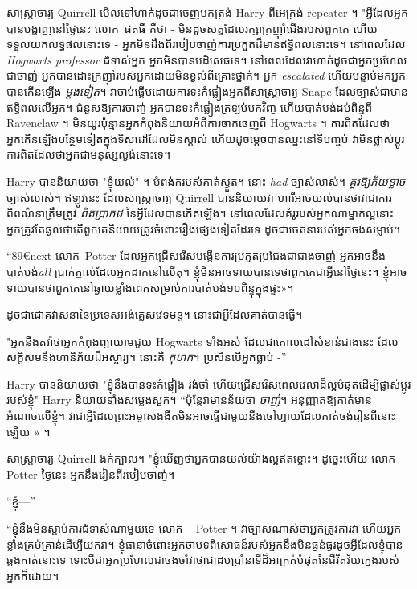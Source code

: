 {{{{សាស្រ្តាចារ្យ Quirrell មើលទៅហាក់ដូចជាចេញមកត្រង់ Harry ពីអេក្រង់ repeater ។ "អ្វីដែលអ្នកបានបង្ហាញនៅថ្ងៃនេះ លោក~ផតធឺ គឺថា - មិនដូចសត្វដែលរក្សាក្រញ៉ាំជើងរបស់ពួកគេ ហើយទទួលយកលទ្ធផលនោះទេ - អ្នកមិនដឹងពីរបៀបចាញ់ការប្រកួតដ៏មានឥទ្ធិពលនោះទេ។ នៅពេលដែល \emph{Hogwarts professor} ជំទាស់អ្នក អ្នកមិនបានបដិសេធទេ។ នៅពេលដែលវាហាក់ដូចជាអ្នកប្រហែលជាចាញ់ អ្នកបានដោះក្រញ៉ាំរបស់អ្នកដោយមិនខ្វល់ពីគ្រោះថ្នាក់។ អ្នក \emph{escalated} ហើយបន្ទាប់មកអ្នកបានកើនឡើង \emph{ម្តងទៀត}។ វាចាប់ផ្តើមដោយការទះកំផ្លៀងអ្នកពីសាស្រ្តាចារ្យ Snape ដែលច្បាស់ជាមានឥទ្ធិពលលើអ្នក។ ជំនួសឱ្យការចាញ់ អ្នកបានទះកំផ្លៀងត្រឡប់មកវិញ ហើយបាត់បង់ដប់ពិន្ទុពី Ravenclaw ។ មិនយូរប៉ុន្មានអ្នកកំពុងនិយាយអំពីការចាកចេញពី Hogwarts ។ ការពិតដែលថាអ្នកកើនឡើងបន្ថែមទៀតក្នុងទិសដៅដែលមិនស្គាល់ ហើយដូចម្ដេចបានឈ្នះនៅទីបញ្ចប់ វាមិនផ្លាស់ប្តូរការពិតដែលថាអ្នកជាមនុស្សល្ងង់នោះទេ។

Harry បាននិយាយថា "ខ្ញុំយល់" ។ បំពង់ករបស់គាត់ស្ងួត។ នោះ \emph{had} ច្បាស់លាស់។ \emph{គួរឱ្យភ័យខ្លាច} ច្បាស់លាស់។ ឥឡូវនេះ ដែលសាស្រ្តាចារ្យ Quirrell បាននិយាយវា ហារីអាចយល់បានថាវាជាការពិពណ៌នាត្រឹមត្រូវ \emph{ពិតប្រាកដ} នៃអ្វីដែលបានកើតឡើង។ នៅពេលដែលគំរូរបស់អ្នកណាម្នាក់ល្អនោះ អ្នកត្រូវតែឆ្ងល់ថាតើពួកគេនិយាយត្រូវចំពោះរឿងផ្សេងទៀតដែរទេ ដូចជាចេតនារបស់អ្នកចង់សម្លាប់។

“89€{next} លោក~Potter ដែលអ្នកជ្រើសរើសបង្កើនការប្រកួតប្រជែងជាជាងចាញ់ អ្នកអាចនឹងបាត់បង់\emph{all} ប្រាក់ភ្នាល់ដែលអ្នកដាក់នៅលើតុ។ ខ្ញុំមិនអាចទាយបានទេថាពួកគេជាអ្វីនៅថ្ងៃនេះ។ ខ្ញុំ​អាច​ទាយ​បាន​ថា​ពួកគេ​នៅ​ឆ្ងាយ​ខ្លាំង​ពេក​សម្រាប់​ការ​បាត់​បង់​១០​ពិន្ទុ​ក្នុង​ផ្ទះ»។

ដូចជាជោគវាសនានៃប្រទេសអង់គ្លេសវេទមន្ត។ នោះជាអ្វីដែលគាត់បានធ្វើ។

"អ្នកនឹងតវ៉ាថាអ្នកកំពុងព្យាយាមជួយ Hogwarts ទាំងអស់ ដែលជាគោលដៅសំខាន់ជាងនេះ ដែលសក្តិសមនឹងហានិភ័យដ៏អស្ចារ្យ។ នោះ​គឺ \emph{កុហក}។ ប្រសិនបើអ្នកធ្លាប់ -”

Harry បាននិយាយថា "ខ្ញុំនឹងបានទះកំផ្លៀង រង់ចាំ ហើយជ្រើសរើសពេលវេលាដ៏ល្អបំផុតដើម្បីផ្លាស់ប្តូររបស់ខ្ញុំ" Harry និយាយទាំងសម្លេងស្អក។ “ប៉ុន្តែវាមានន័យថា \emph{ចាញ់}។ អនុញ្ញាតឱ្យគាត់មានអំណាចលើខ្ញុំ។ វា​ជា​អ្វី​ដែល​ព្រះអម្ចាស់​ងងឹត​មិន​អាច​ធ្វើ​ជាមួយ​នឹង​ចៅហ្វាយ​ដែល​គាត់​ចង់​រៀន​ពី​នោះ​ឡើយ » ។

សាស្ត្រាចារ្យ Quirrell ងក់ក្បាល។ "ខ្ញុំឃើញថាអ្នកបានយល់យ៉ាងល្អឥតខ្ចោះ។ ដូច្នេះហើយ លោក Potter ថ្ងៃនេះ អ្នកនឹងរៀនពីរបៀបចាញ់។

“ខ្ញុំ—”

“ខ្ញុំនឹងមិនស្តាប់ការជំទាស់ណាមួយទេ លោក ~ Potter ។ វាច្បាស់ណាស់ថាអ្នកត្រូវការវា ហើយអ្នកខ្លាំងគ្រប់គ្រាន់ដើម្បីយកវា។ ខ្ញុំធានាចំពោះអ្នកថាបទពិសោធន៍របស់អ្នកនឹងមិនធ្ងន់ធ្ងរដូចអ្វីដែលខ្ញុំបានឆ្លងកាត់នោះទេ ទោះបីជាអ្នកប្រហែលជាចងចាំវាថាជាដប់ប្រាំនាទីដ៏អាក្រក់បំផុតនៃជីវិតវ័យក្មេងរបស់អ្នកក៏ដោយ។

}}}}
